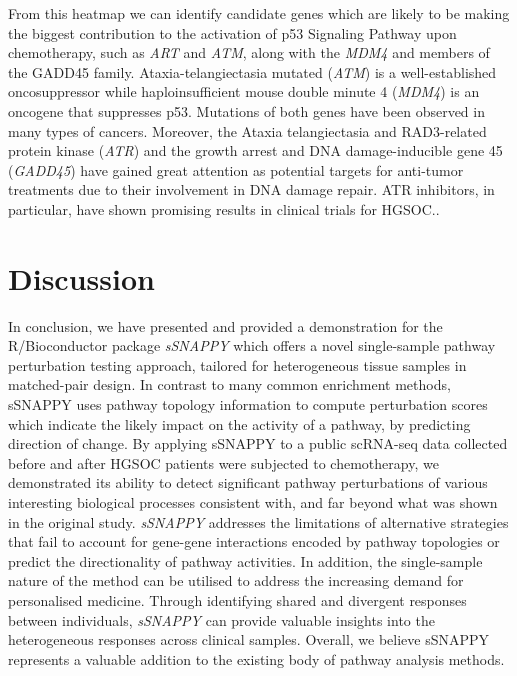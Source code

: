 \documentclass[9pt,a4paper,]{extarticle}
\begin{document}
From this heatmap we can identify candidate genes which are likely to be making the biggest contribution to the activation of p53 Signaling Pathway upon chemotherapy, such as \emph{ART} and \emph{ATM}, along with the \emph{MDM4} and members of the GADD45 family.
Ataxia-telangiectasia mutated (\emph{ATM}) is a well-established oncosuppressor\citep{Moslemi2021} while haploinsufficient mouse double minute 4 (\emph{MDM4}) is an oncogene that suppresses p53\citep{Momand}. Mutations of both genes have been observed in many types of cancers\citep{Choi2016, Gansmo2016, Atwal2009}.
Moreover, the Ataxia telangiectasia and RAD3-related protein kinase (\emph{ATR}) and the growth arrest and DNA damage-inducible gene 45 (\emph{GADD45}) have gained great attention as potential targets for anti-tumor treatments due to their involvement in DNA damage repair\citep{Liebermann2011, Hu2022}.
ATR inhibitors, in particular, have shown promising results in clinical trials for HGSOC.\citep{Li2022, Gong2021}.

\hypertarget{discussion}{%
\section{Discussion}\label{discussion}}

In conclusion, we have presented and provided a demonstration for the R/Bioconductor package \emph{sSNAPPY} which offers a novel single-sample pathway perturbation testing approach, tailored for heterogeneous tissue samples in matched-pair design.
In contrast to many common enrichment methods, sSNAPPY uses pathway topology information to compute perturbation scores which indicate the likely impact on the activity of a pathway, by predicting direction of change.
By applying sSNAPPY to a public scRNA-seq data collected before and after HGSOC patients were subjected to chemotherapy, we demonstrated its ability to detect significant pathway perturbations of various interesting biological processes consistent with, and far beyond what was shown in the original study.
\emph{sSNAPPY} addresses the limitations of alternative strategies that fail to account for gene-gene interactions encoded by pathway topologies or predict the directionality of pathway activities.
In addition, the single-sample nature of the method can be utilised to address the increasing demand for personalised medicine.
Through identifying shared and divergent responses between individuals, \emph{sSNAPPY} can provide valuable insights into the heterogeneous responses across clinical samples.
Overall, we believe sSNAPPY represents a valuable addition to the existing body of pathway analysis methods.
\end{document}
